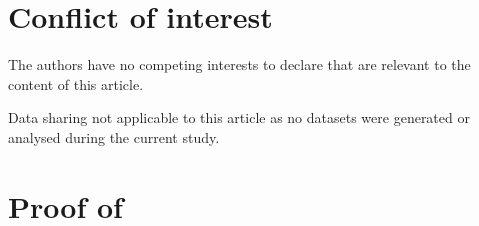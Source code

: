 \documentclass[reqno]{amsart}
\theoremstyle{plain}
\theoremstyle{definition}
\numberwithin{equation}{section}
\begin{document}
\bigskip




\section*{Conflict of interest}


The authors have no competing interests to declare that are relevant to the content of this article.




 Data sharing not applicable to this article as no datasets were generated or analysed during the current study.
 
 
 \appendix 
\section{Proof of }\label{appendix}

 
\end{document}
